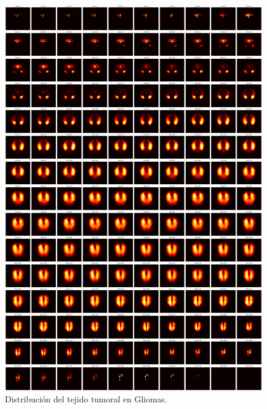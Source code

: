 \begin{figure}[H]
	\centering
	\includegraphics[width=1.0\linewidth]{imagenes/metodologia_heatmapsGLI.png}
	\caption{Distribución del tejido tumoral en Gliomas.}
\end{figure}

